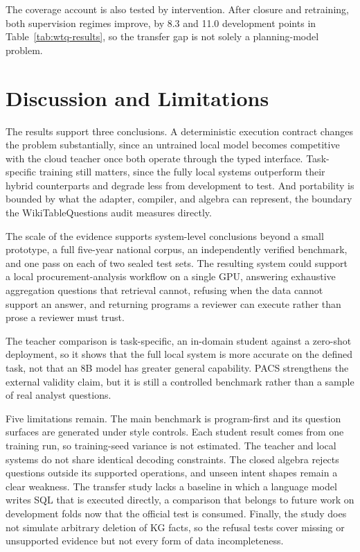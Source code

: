 \documentclass{article}
\begin{document}
The coverage account is also tested by intervention. After closure and
retraining, both supervision regimes improve, by 8.3 and 11.0 development
points in Table~\ref{tab:wtq-results}, so the transfer gap is not solely a
planning-model problem.

\section{Discussion and Limitations}
\label{sec:discussion}

The results support three conclusions. A deterministic execution contract
changes the problem substantially, since an untrained local model becomes
competitive with the cloud teacher once both operate through the typed
interface. Task-specific training still matters, since the fully local
systems outperform their hybrid counterparts and degrade less from
development to test. And portability is bounded by what the adapter,
compiler, and algebra can represent, the boundary the WikiTableQuestions
audit measures directly.

The scale of the evidence supports system-level conclusions beyond a
small prototype, a full five-year national corpus, an independently
verified benchmark, and one pass on each of two sealed test sets. The
resulting system could support a local procurement-analysis workflow on a
single GPU, answering exhaustive aggregation questions that retrieval
cannot, refusing when the data cannot support an answer, and returning
programs a reviewer can execute rather than prose a reviewer must trust.

The teacher comparison is task-specific, an in-domain student against a
zero-shot deployment, so it shows that the full local system is more
accurate on the defined task, not that an 8B model has greater general
capability. PACS strengthens the external validity claim, but it is still
a controlled benchmark rather than a sample of real analyst questions.

Five limitations remain. The main benchmark is program-first and its
question surfaces are generated under style controls. Each student result
comes from one training run, so training-seed variance is not estimated.
The teacher and local systems do not share identical decoding constraints.
The closed algebra rejects questions outside its supported operations, and
unseen intent shapes remain a clear weakness. The transfer study lacks a
baseline in which a language model writes SQL that is executed directly,
a comparison that belongs to future work on development folds now that the
official test is consumed. Finally, the study does not simulate arbitrary
deletion of KG facts, so the refusal tests cover missing or unsupported
evidence but not every form of data incompleteness.
\end{document}

